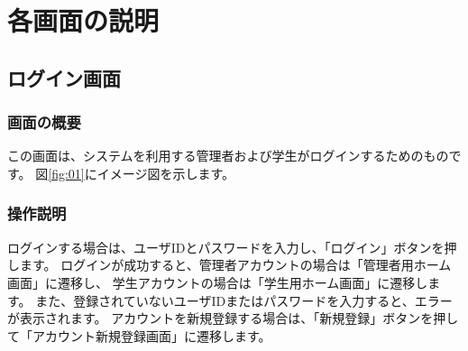 \section{各画面の説明}
\subsection{ログイン画面}
\subsubsection{画面の概要}
この画面は、システムを利用する管理者および学生がログインするためのものです。
図\ref{fig:01}にイメージ図を示します。

\subsubsection{操作説明}
ログインする場合は、ユーザIDとパスワードを入力し、「ログイン」ボタンを押します。
ログインが成功すると、管理者アカウントの場合は「管理者用ホーム画面」に遷移し、
学生アカウントの場合は「学生用ホーム画面」に遷移します。
また、登録されていないユーザIDまたはパスワードを入力すると、エラーが表示されます。
アカウントを新規登録する場合は、「新規登録」ボタンを押して「アカウント新規登録画面」に遷移します。

\newpage



